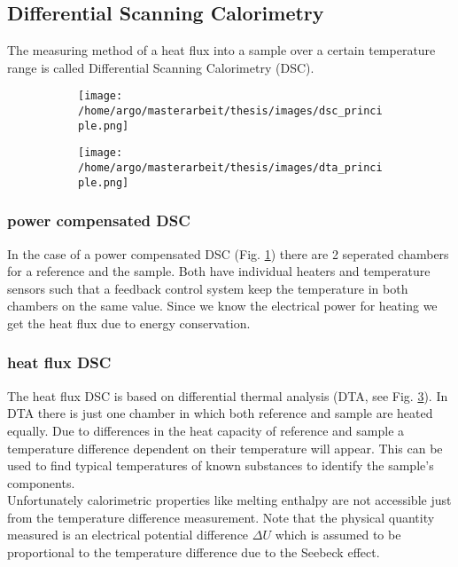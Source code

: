 \documentclass{scrartcl}[12pt, halfparskip]
\begin{document}
\subsection{Differential Scanning Calorimetry}
\label{sec:physics_DSC}
The measuring method of a heat flux into a sample over a certain temperature range is called Differential Scanning Calorimetry (DSC). 

\begin{figure}[H]
	\centering
	\begin{subfigure}{0.49\textwidth}
		\texttt{[image: /home/argo/masterarbeit/thesis/images/dsc\_principle.png]}
		\caption{}
		\label{fig:DSC_power_compensated_principle}
	\end{subfigure}
	\begin{subfigure}{0.49\textwidth}
		\texttt{[image: /home/argo/masterarbeit/thesis/images/dta\_principle.png]}
		\caption{}
		\label{fig:DTA_principle}
	\end{subfigure}
	\caption{}
\end{figure}


\subsubsection{power compensated DSC}
In the case of a power compensated DSC (Fig. \ref{fig:DSC_power_compensated_principle}) there are 2 seperated chambers for a reference and the sample. Both have individual heaters and temperature sensors such that a feedback control system keep the temperature in both chambers on the same value. Since we know the electrical power for heating we get the heat flux due to energy conservation. \\



\subsubsection{heat flux DSC}
The heat flux DSC is based on differential thermal analysis (DTA, see Fig. \ref{fig:DTA_principle}). 
In DTA there is just one chamber in which both reference and sample are heated equally. 
Due to differences in the heat capacity of reference and sample a temperature difference dependent on their temperature will appear.
This can be used to find typical temperatures of known substances to identify the sample's components. \\
Unfortunately calorimetric properties like melting enthalpy are not accessible just from the temperature difference measurement. 
Note that the physical quantity measured is an electrical potential difference $\Delta U$ which is assumed to be proportional to the temperature difference due to the Seebeck effect. \\
\end{document}
